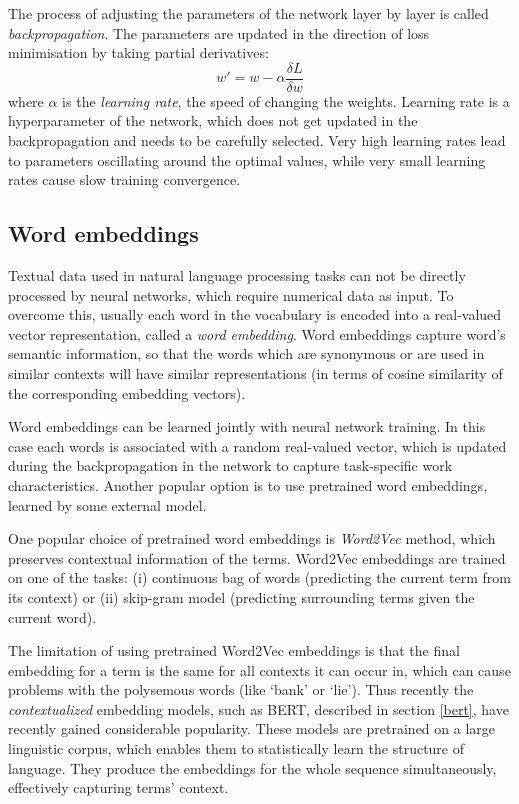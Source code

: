 The process of adjusting the parameters of the network layer by layer is called \textit{backpropagation}. The parameters are updated in the direction of loss minimisation by taking partial derivatives:
\begin{equation}
    w' = w - \alpha\frac{\delta L}{\delta w}
\end{equation}
where $\alpha$ is the \textit{learning rate}, the speed of changing the weights. Learning rate is a hyperparameter of the network, which does not get updated in the backpropagation and needs to be carefully selected. Very high learning rates lead to parameters oscillating around the optimal values, while very small learning rates cause slow training convergence.

\subsection{Word embeddings}

Textual data used in natural language processing tasks can not be directly processed by neural networks, which require numerical data as input. To overcome this, usually each word in the vocabulary is encoded into a real-valued vector representation, called a \textit{word embedding}. Word embeddings capture word's semantic information, so that the words which are synonymous or are used in similar contexts will have similar representations (in terms of cosine similarity of the corresponding embedding vectors).

Word embeddings can be learned jointly with neural network training. In this case each words is associated with a random real-valued vector, which is updated during the backpropagation in the network to capture task-specific work characteristics. Another popular option is to use pretrained word embeddings, learned by some external model.

One popular choice of pretrained word embeddings is \textit{Word2Vec} \cite{mikolov2013efficient} method, which preserves contextual information of the terms. Word2Vec embeddings are trained on one of the tasks: (i) continuous bag of words (predicting the current term from its context) or (ii) skip-gram model (predicting surrounding terms given the current word). 

The limitation of using pretrained Word2Vec embeddings is that the final embedding for a term is the same for all contexts it can occur in, which can cause problems with the polysemous words (like `bank' or `lie'). Thus recently the \textit{contextualized} embedding models, such as BERT, described in section \ref{bert}, have recently gained considerable popularity. These models are pretrained on a large linguistic corpus, which enables them to statistically learn the structure of language. They produce the embeddings for the whole sequence simultaneously, effectively capturing terms' context. 

